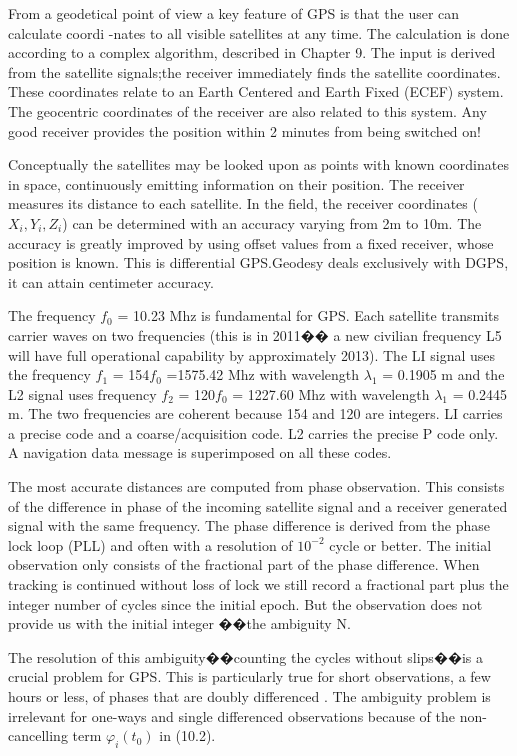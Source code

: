 From a geodetical point of view a key feature of GPS is that the user can calculate coordi
-nates to all visible satellites at any time. The calculation is done according to a complex algorithm, described in Chapter 9. The input is derived from the satellite signals;the receiver immediately finds the satellite coordinates. These coordinates relate to an Earth Centered and Earth Fixed (ECEF) system. The geocentric coordinates of the receiver are also related to this system. Any good receiver provides the position within 2 minutes from being switched on!

Conceptually the satellites may be looked upon as points with known coordinates in space, continuously emitting information on their position. The receiver measures its distance to each satellite. In the field, the receiver coordinates ($X_{i},Y_{i},Z_{i}$) can be determined with an accuracy varying from 2m to 10m. The accuracy is greatly improved by using offset values from a fixed receiver, whose position is known. This is differential GPS.Geodesy deals exclusively with DGPS, it can attain centimeter accuracy.

The frequency $f_{0}$ = 10.23 Mhz is fundamental for GPS. Each satellite transmits carrier waves on two frequencies (this is in 2011�� a new civilian frequency L5 will have full operational capability by approximately 2013). The LI signal uses the frequency $f_{1}$ = 154$f_{0}$  =1575.42 Mhz with wavelength $\lambda_{1}$ = 0.1905 m and the L2 signal uses frequency $f_{2}$ = 120$f_{0}$ = 1227.60 Mhz with wavelength $\lambda_{1}$ = 0.2445 m. The two frequencies are coherent because 154 and 120 are integers. LI carries a precise code and a coarse/acquisition code. L2 carries the precise P code only. A navigation data message is superimposed on all these codes.

The most accurate distances are computed from phase observation. This consists of the difference in phase of the incoming satellite signal and a receiver generated signal with the same frequency. The phase difference is derived from the phase lock loop (PLL) and often with a resolution of $10^{-2}$ cycle or better. The initial observation only consists of the fractional part of the phase difference. When tracking is continued without loss of lock we still record a fractional part plus the integer number of cycles since the initial epoch. But the observation does not provide us with the initial integer ��the ambiguity N.

The resolution of this ambiguity��counting the cycles without slips��is a crucial problem for GPS. This is particularly true for short observations, a few hours or less, of phases that are doubly differenced . The ambiguity problem is irrelevant for one-ways and single differenced observations because of the non-cancelling term $\varphi_{i}(t_{0})$ in (10.2).

